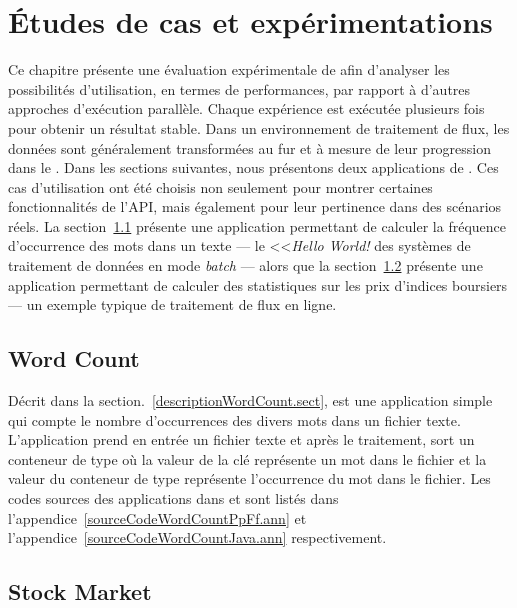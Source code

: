 
\chapter{\'Etudes de cas et exp\'erimentations}
\label{experiences.chap}

Ce chapitre pr\'esente une \'evaluation exp\'erimentale de  afin d'analyser les possibilit\'es d'utilisation, en termes de performances, par rapport \`a d'autres approches d'ex\'ecution parall\`ele. Chaque exp\'erience est ex\'ecut\'ee plusieurs fois pour obtenir un r\'esultat stable. Dans un environnement de traitement de flux, les donn\'ees sont g\'en\'eralement transform\'ees au fur et \`a mesure de leur progression dans le . Dans les sections suivantes, nous pr\'esentons deux applications de . Ces cas d'utilisation ont \'et\'e choisis non seulement pour montrer certaines fonctionnalit\'es de l'API, mais \'egalement pour leur pertinence dans des sc\'enarios r\'eels. La section~\ref{wordcount.sect} pr\'esente une application permettant de calculer la fr\'equence d'occurrence des mots dans un texte --- le <<\emph{Hello World!} des syst\`emes de traitement de donn\'ees en mode \emph{batch} --- alors que la section~\ref{stockprice.sect} pr\'esente une application permettant de calculer des statistiques sur les prix d'indices boursiers --- un exemple typique de traitement de flux en ligne.


\section{Word Count}
\label{wordcount.sect}

D\'ecrit dans la section.~\ref{descriptionWordCount.sect},  est une application simple qui compte le nombre d'occurrences des divers mots dans un fichier texte. L'application prend en entr\'ee un fichier texte et apr\`es le traitement, sort un conteneur de type  où la valeur de la cl\'e repr\'esente un mot dans le fichier et la valeur du conteneur de type  repr\'esente l'occurrence du mot dans le fichier. Les codes sources des applications  dans  et  sont list\'es dans l'appendice~\ref{sourceCodeWordCountPpFf.ann} et l'appendice~\ref{sourceCodeWordCountJava.ann} respectivement.



\section{Stock Market}
\label{stockprice.sect}

